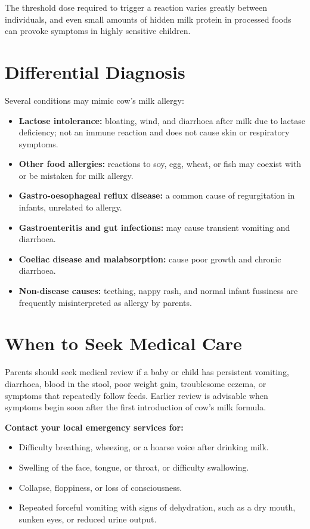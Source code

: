 The threshold dose required to trigger a reaction varies greatly between individuals, and even small amounts of hidden milk protein in processed foods can provoke symptoms in highly sensitive children.

\section*{Differential Diagnosis}
Several conditions may mimic cow's milk allergy:

\begin{itemize}
    \item \textbf{Lactose intolerance:} bloating, wind, and diarrhoea after milk due to lactase deficiency; not an immune reaction and does not cause skin or respiratory symptoms.
    \item \textbf{Other food allergies:} reactions to soy, egg, wheat, or fish may coexist with or be mistaken for milk allergy.
    \item \textbf{Gastro-oesophageal reflux disease:} a common cause of regurgitation in infants, unrelated to allergy.
    \item \textbf{Gastroenteritis and gut infections:} may cause transient vomiting and diarrhoea.
    \item \textbf{Coeliac disease and malabsorption:} cause poor growth and chronic diarrhoea.
    \item \textbf{Non-disease causes:} teething, nappy rash, and normal infant fussiness are frequently misinterpreted as allergy by parents.
\end{itemize}

\section*{When to Seek Medical Care}
Parents should seek medical review if a baby or child has persistent vomiting, diarrhoea, blood in the stool, poor weight gain, troublesome eczema, or symptoms that repeatedly follow feeds. Earlier review is advisable when symptoms begin soon after the first introduction of cow's milk formula.

\textbf{Contact your local emergency services for:}
\begin{itemize}
    \item Difficulty breathing, wheezing, or a hoarse voice after drinking milk.
    \item Swelling of the face, tongue, or throat, or difficulty swallowing.
    \item Collapse, floppiness, or loss of consciousness.
    \item Repeated forceful vomiting with signs of dehydration, such as a dry mouth, sunken eyes, or reduced urine output.
\end{itemize}

